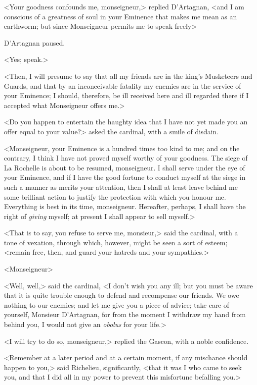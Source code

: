 <Your goodness confounds me, monseigneur,> replied D'Artagnan, <and I am conscious of a greatness of soul in your Eminence that makes me mean as an earthworm; but since Monseigneur permits me to speak freely\longdash> 

D'Artagnan paused. 

<Yes; speak.> 

<Then, I will presume to say that all my friends are in the king's Musketeers and Guards, and that by an inconceivable fatality my enemies are in the service of your Eminence; I should, therefore, be ill received here and ill regarded there if I accepted what Monseigneur offers me.> 

<Do you happen to entertain the haughty idea that I have not yet made you an offer equal to your value?> asked the cardinal, with a smile of disdain. 

<Monseigneur, your Eminence is a hundred times too kind to me; and on the contrary, I think I have not proved myself worthy of your goodness. The siege of La Rochelle is about to be resumed, monseigneur. I shall serve under the eye of your Eminence, and if I have the good fortune to conduct myself at the siege in such a manner as merits your attention, then I shall at least leave behind me some brilliant action to justify the protection with which you honour me. Everything is best in its time, monseigneur. Hereafter, perhaps, I shall have the right of \emph{giving} myself; at present I shall appear to sell myself.> 

<That is to say, you refuse to serve me, monsieur,> said the cardinal, with a tone of vexation, through which, however, might be seen a sort of esteem; <remain free, then, and guard your hatreds and your sympathies.> 

<Monseigneur\longdash> 

<Well, well,> said the cardinal, <I don't wish you any ill; but you must be aware that it is quite trouble enough to defend and recompense our friends. We owe nothing to our enemies; and let me give you a piece of advice; take care of yourself, Monsieur D'Artagnan, for from the moment I withdraw my hand from behind you, I would not give an \emph{obolus} for your life.> 

<I will try to do so, monseigneur,> replied the Gascon, with a noble confidence. 

<Remember at a later period and at a certain moment, if any mischance should happen to you,> said Richelieu, significantly, <that it was I who came to seek you, and that I did all in my power to prevent this misfortune befalling you.> 

